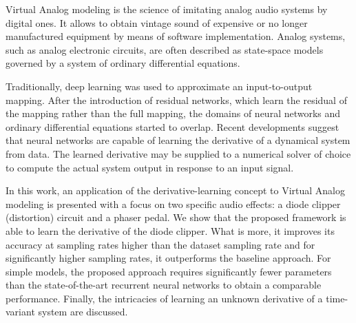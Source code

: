 Virtual Analog modeling is the science of imitating analog audio systems by digital ones. It allows to obtain vintage sound of expensive or no longer manufactured equipment by means of software implementation. Analog systems, such as analog electronic circuits, are often described as state-space models governed by a system of ordinary differential equations. 

Traditionally, deep learning was used to approximate an input-to-output mapping. After the introduction of residual networks, which learn the residual of the mapping rather than the full mapping, the domains of neural networks and ordinary differential equations started to overlap. Recent developments suggest that neural networks are capable of learning the derivative of a dynamical system from data. The learned derivative may be supplied to a numerical solver of choice to compute the actual system output in response to an input signal. 

In this work, an application of the derivative-learning concept to Virtual Analog modeling is presented with a focus on two specific audio effects: a diode clipper (distortion) circuit and a phaser pedal. We show that the proposed framework is able to learn the derivative of the diode clipper. What is more, it improves its accuracy at sampling rates higher than the dataset sampling rate and for significantly higher sampling rates, it outperforms the baseline approach. For simple models, the proposed approach requires significantly fewer parameters than the state-of-the-art recurrent neural networks to obtain a comparable performance. Finally, the intricacies of learning an unknown derivative of a time-variant system are discussed.
